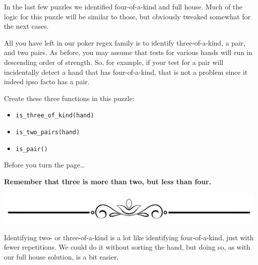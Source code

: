 In the last few puzzles we identified four-of-a-kind and full house.
Much of the logic for this puzzle will be similar to those, but
obviously tweaked somewhat for the next cases.

All you have left in our poker regex family is to identify
three-of-a-kind, a pair, and two pairs. As before, you may assume that
tests for various hands will run in descending order of strength. So,
for example, if your test for a pair will incidentally detect a hand
that has four-of-a-kind, that is not a problem since it indeed ipso
facto has a pair.

Create these three functions in this puzzle:

\begin{itemize}
\tightlist
\item
  \texttt{is\_three\_of\_kind(hand)}
\item
  \texttt{is\_two\_pairs(hand)}
\item
  \texttt{is\_pair()}
\end{itemize}

Before you turn the page\ldots{}

\textbf{Remember that three is more than two, but less than four.}

\includegraphics{images/Elegant-Flourish-Frame-Extrapolated-19.svg}

\newpage

Identifying two- or three-of-a-kind is a lot like identifying
four-of-a-kind, just with fewer repetitions. We could do it without
sorting the hand, but doing so, as with our full house solution, is a
bit easier.

